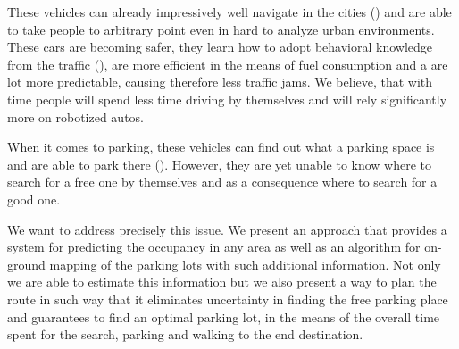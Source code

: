     These vehicles can already impressively well navigate in the cities (\cite{stanley_auto_car,perceprion_drivec_car,lima13}) and are able to take people to arbitrary point even in hard to analyze urban environments. These cars are becoming safer, they learn how to adopt behavioral knowledge from the traffic (\cite{behaviour_learning,spinello10:multiclass }), are more efficient in the means of fuel consumption and a are lot more predictable, causing therefore less traffic jams. We believe, that with time people will spend less time driving by themselves and will rely significantly more on robotized autos.

    When it comes to parking, these vehicles can find out what a parking space is and are able to park there (\cite{auto_cars_burgard,auto_parking09,auto_park2_11}). However, they are yet unable to know where to search for a free one by themselves and as a consequence where to search for a good one.

    We want to address precisely this issue. We present an approach that provides a system for predicting the occupancy in any area as well as an algorithm for on-ground mapping of the parking lots with such additional information. Not only we are able to estimate this information but we also present a way to plan the route in such way that it eliminates uncertainty in finding the free parking place and guarantees to find an optimal parking lot, in the means of the overall time spent for the search, parking and walking to the end destination.
